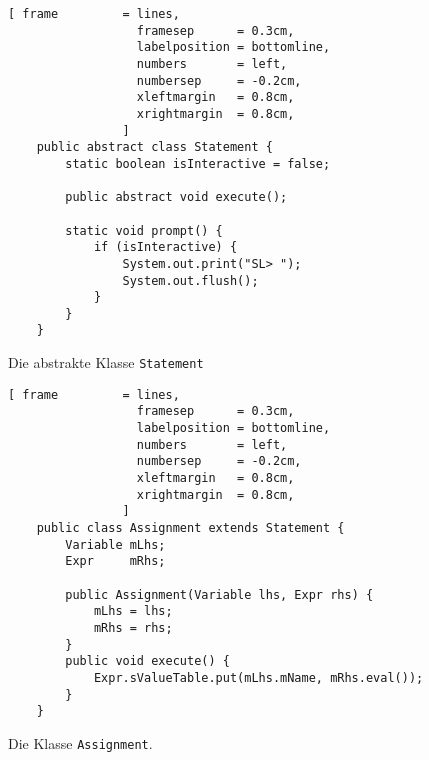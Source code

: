 \begin{figure}[!ht]
\centering
\begin{Verbatim}[ frame         = lines, 
                  framesep      = 0.3cm, 
                  labelposition = bottomline,
                  numbers       = left,
                  numbersep     = -0.2cm,
                  xleftmargin   = 0.8cm,
                  xrightmargin  = 0.8cm,
                ]
    public abstract class Statement {
        static boolean isInteractive = false;
        
        public abstract void execute();
    
        static void prompt() {
            if (isInteractive) {
                System.out.print("SL> ");
                System.out.flush();
            }
        }
    }
\end{Verbatim}
\vspace*{-0.3cm}
\caption{Die abstrakte Klasse \texttt{Statement}}
\label{fig:Statement.java}
\end{figure}

\begin{figure}[!ht]
\centering
\begin{Verbatim}[ frame         = lines, 
                  framesep      = 0.3cm, 
                  labelposition = bottomline,
                  numbers       = left,
                  numbersep     = -0.2cm,
                  xleftmargin   = 0.8cm,
                  xrightmargin  = 0.8cm,
                ]
    public class Assignment extends Statement {
        Variable mLhs;
        Expr     mRhs;
        
        public Assignment(Variable lhs, Expr rhs) {
            mLhs = lhs;
            mRhs = rhs;
        }
        public void execute() {
            Expr.sValueTable.put(mLhs.mName, mRhs.eval());
        }
    }
\end{Verbatim}
\vspace*{-0.3cm}
\caption{Die Klasse \texttt{Assignment}.}
\label{fig:Assignment.java}
\end{figure}


\vspace*{\fill} \pagebreak

